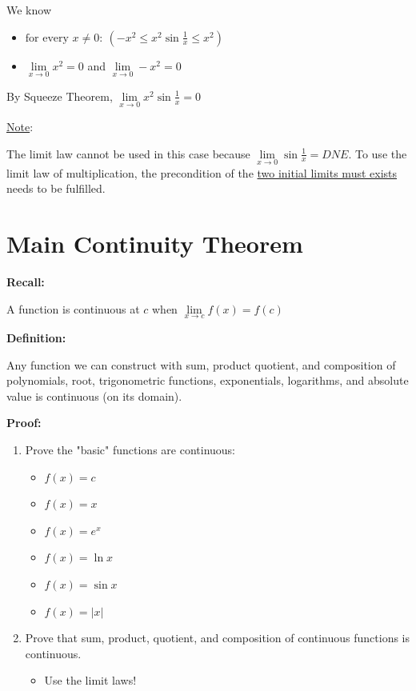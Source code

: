 \documentclass[11pt]{article}
\begin{document}
We know
\begin{itemize}
    \item \(\text{for every } x \neq 0: \ (-x^2 \leq x^2\sin\frac{1}{x} \leq x^2)\)
    \item $\lim\limits_{x \to 0} x^2 = 0$ and $\lim\limits_{x \to 0} -x^2 = 0$
\end{itemize}

By Squeeze Theorem, $\lim\limits_{x \to 0} x^2\sin\frac{1}{x} = 0$
\bigskip

\underline{Note}:

The limit law cannot be used in this case because $\lim\limits_{x \to 0} \sin\frac{1}{x} = DNE$. To use the limit law of multiplication, the precondition of the \underline{two initial limits must exists} needs to be fulfilled. 

\section{Main Continuity Theorem}

\textbf{Recall:}

A function is continuous at \(c\) when $\lim\limits_{x \to c} f(x) = f(c)$
\bigskip

\noindent
\textbf{Definition:}

Any function we can construct with sum, product quotient, and composition of polynomials, root, trigonometric functions, exponentials, logarithms, and absolute value is continuous (on its domain).
\bigskip

\noindent
\textbf{Proof:}

\begin{enumerate}
    \item Prove the "basic" functions are continuous:
    \begin{itemize}
        \item $f(x) = c$
        \item $f(x) = x$
        \item $f(x) = e^x$
        \item $f(x) = \ln x$
        \item $f(x) = \sin x$
        \item $f(x) = |x|$
    \end{itemize}
    \item Prove that sum, product, quotient, and composition of continuous functions is continuous.
    \begin{itemize}
        \item Use the limit laws!
    \end{itemize}
\end{enumerate}
\bigskip
\end{document}
